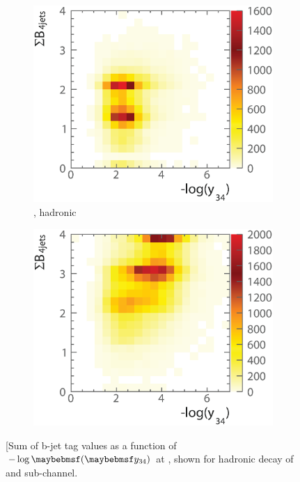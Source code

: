 \begin{figure}[!tbp]
  \begin{subfigure}[b]{0.45\textwidth}
    \includegraphics[width=\textwidth]{doubleHiggs/preSel/mutual6022bbWW2}
    \caption{\eeToHHbbWW, hadronic}
    \label{fig:doubleHiggs1.4MutualbbWW}
  \end{subfigure}
    \begin{subfigure}[b]{0.45\textwidth}
    \includegraphics[width=\textwidth]{doubleHiggs/preSel/mutual6022bbbb2}
    \caption{\eeToHHbbbb}
    \label{fig:doubleHiggs1.4Mutualbbbb}
  \end{subfigure}
\caption[Sum of b-jet tag values as a function of $-\log\parenths{\y{34}}$ at ]%
   {[Sum of b-jet tag values as a function of $-\log\parenths{\y{34}}$ at , shown for hadronic decay of \eeToHHbbWW and \eeToHHbbWW sub-channel. }
   \label{fig:doubleHiggsMutualPreselection}
\end{figure}


